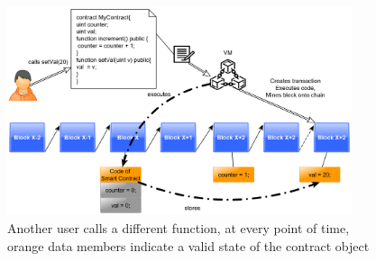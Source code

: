 \documentclass[a4paper]{article}
\begin{document}
\begin{figure}[H]
    \centering
    \includegraphics[width=0.9\textwidth]{figures/deploy_2.png}
    \caption{Another user calls a different function, at every point of time, orange data members indicate a valid state of the contract object}
    \label{fig:deploy_2}
\end{figure}

\end{document}
